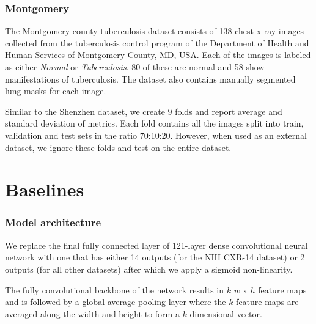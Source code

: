 \documentclass[8pt]{beamer}
\begin{document}
\begin{frame}

  \frametitle{Montgomery}

  The Montgomery county tuberculosis dataset consists of 138 chest x-ray images
  collected from the tuberculosis control program of the Department of Health
  and Human Services of Montgomery County, MD, USA. Each of the images is
  labeled as either \emph{Normal} or \emph{Tuberculosis}. 80 of these are normal
  and 58 show manifestations of tuberculosis. The dataset also contains manually
  segmented lung masks for each image.\\ \pause

  \vspace{\baselineskip}

  Similar to the Shenzhen dataset, we create 9 folds and report average and
  standard deviation of metrics. Each fold contains all the images split into
  train, validation and test sets in the ratio 70:10:20. However, when used as
  an external dataset, we ignore these folds and test on the entire dataset.

\end{frame}

\section{Baselines}

\begin{frame}
  \frametitle{Model architecture}
  
  We replace the final fully connected layer of 121-layer dense convolutional
  neural network with one that has either 14 outputs (for the NIH CXR-14
  dataset) or 2 outputs (for all other datasets) after which we apply a sigmoid
  non-linearity. \\ \pause

  \vspace{\baselineskip}

  The fully convolutional backbone of the network results in $k$ $w$ x $h$
  feature maps and is followed by a global-average-pooling layer where the $k$
  feature maps are averaged along the width and height to form a $k$ dimensional
  vector.
\end{frame}
\end{document}
